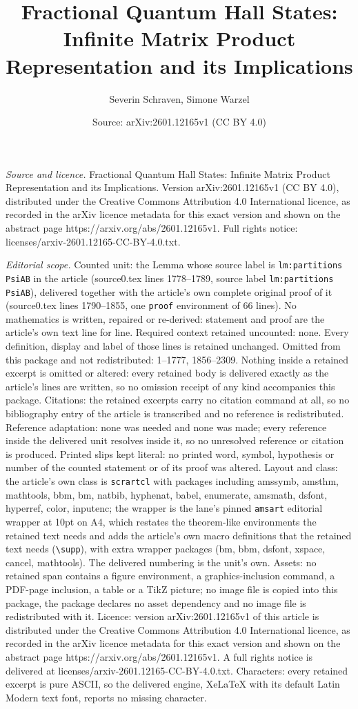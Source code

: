 \documentclass[10pt,a4paper]{amsart}
\title[Fractional Quantum Hall States: Infinite Matrix Product Repr]{Fractional Quantum Hall States: Infinite Matrix Product Representation and its Implications}
\author{Severin Schraven, Simone Warzel}
\date{Source: arXiv:2601.12165v1 (CC BY 4.0)}
\begin{document}
\maketitle

\noindent\emph{Source and licence.} Fractional Quantum Hall States: Infinite Matrix Product Representation and its Implications. Version arXiv:2601.12165v1 (CC BY 4.0), distributed under the Creative Commons Attribution 4.0 International licence, as recorded in the arXiv licence metadata for this exact version and shown on the abstract page https://arxiv.org/abs/2601.12165v1. Full rights notice: licenses/arxiv-2601.12165-CC-BY-4.0.txt.\par\smallskip

\noindent\textit{Editorial scope.} Counted unit: the Lemma whose source label is \texttt{lm:partitions PsiAB} in the article (source0.tex lines 1778--1789, source label \texttt{lm:partitions PsiAB}), delivered together with the article's own complete original proof of it (source0.tex lines 1790--1855, one \texttt{proof} environment of 66 lines). No mathematics is written, repaired or re-derived: statement and proof are the article's own text line for line. Required context retained uncounted: none. Every definition, display and label of those lines is retained unchanged. Omitted from this package and not redistributed: 1--1777, 1856--2309. Nothing inside a retained excerpt is omitted or altered: every retained body is delivered exactly as the article's lines are written, so no omission receipt of any kind accompanies this package. Citations: the retained excerpts carry no citation command at all, so no bibliography entry of the article is transcribed and no reference is redistributed. Reference adaptation: none was needed and none was made; every reference inside the delivered unit resolves inside it, so no unresolved reference or citation is produced. Printed slips kept literal: no printed word, symbol, hypothesis or number of the counted statement or of its proof was altered. Layout and class: the article's own class is \texttt{scrartcl} with packages including amssymb, amsthm, mathtools, bbm, bm, natbib, hyphenat, babel, enumerate, amsmath, dsfont, hyperref, color, inputenc; the wrapper is the lane's pinned \texttt{amsart} editorial wrapper at 10pt on A4, which restates the theorem-like environments the retained text needs and adds the article's own macro definitions that the retained text needs (\texttt{\textbackslash supp}), with extra wrapper packages (bm, bbm, dsfont, xspace, cancel, mathtools). The delivered numbering is the unit's own. Assets: no retained span contains a figure environment, a graphics-inclusion command, a PDF-page inclusion, a table or a TikZ picture; no image file is copied into this package, the package declares no asset dependency and no image file is redistributed with it. Licence: version arXiv:2601.12165v1 of this article is distributed under the Creative Commons Attribution 4.0 International licence, as recorded in the arXiv licence metadata for this exact version and shown on the abstract page https://arxiv.org/abs/2601.12165v1. A full rights notice is delivered at licenses/arxiv-2601.12165-CC-BY-4.0.txt. Characters: every retained excerpt is pure ASCII, so the delivered engine, XeLaTeX with its default Latin Modern text font, reports no missing character.
\end{document}
